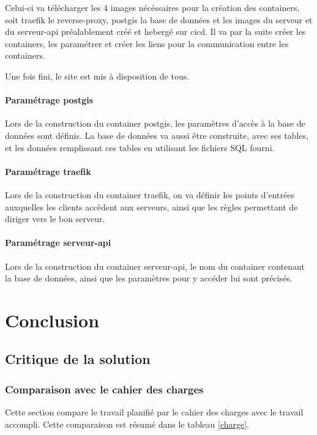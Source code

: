 \documentclass[
    iai, %
    il, %
]{heig-tb}
\begin{document}
Celui-ci va télécharger les 4 images nécéssaires pour la création des containers, soit \gls{traefik} le reverse-proxy,
\gls{postgis} la base de données et les images du serveur et du serveur-api préalablement créé et hebergé sur \gls{cicd}.
Il va par la suite créer les containers, les paramétrer et créer les liens pour la communication entre les containers.

Une fois fini, le site est mis à disposition de tous.

\subsubsection{Paramétrage \gls{postgis}}
Lors de la construction du container \gls{postgis}, les paramètres d'accès à la base de données sont définis.
La base de données va aussi être construite, avec ses tables, et les données remplissant ces tables en utilisant les fichiers SQL fourni.

\subsubsection{Paramétrage \gls{traefik}}
Lors de la construction du container \gls{traefik}, on va définir les points d'entrées auxquelles les clients accèdent aux serveurs,
ainsi que les règles permettant de diriger vers le bon serveur.

\subsubsection{Paramétrage serveur-api}
Lors de la construction du container serveur-api, le nom du container contenant la base de données,
ainsi que les paramètres pour y accéder lui sont précisés.

\chapter{Conclusion}

\section{Critique de la solution}

\subsection{Comparaison avec le cahier des charges}
Cette section compare le travail planifié par le cahier des charges avec le travail accompli.
Cette comparaison est résumé dans le tableau \ref{charge}.
\end{document}

